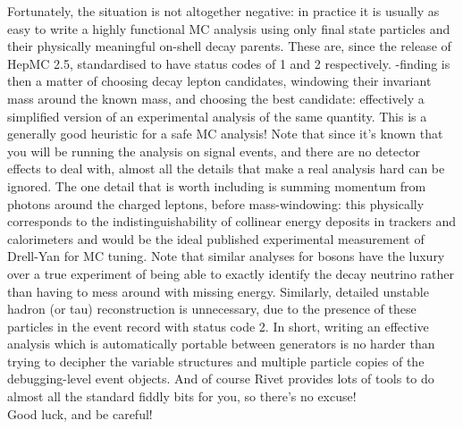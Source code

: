 Fortunately, the situation is not altogether negative: in practice it is usually
as easy to write a highly functional MC analysis using only final state
particles and their physically meaningful on-shell decay parents. These are,
since the release of HepMC 2.5, standardised to have status codes of 1 and 2
respectively. \PZ-finding is then a matter of choosing decay lepton candidates,
windowing their invariant mass around the known \PZ mass, and choosing the best
\PZ candidate: effectively a simplified version of an experimental analysis of
the same quantity. This is a generally good heuristic for a safe MC analysis!
Note that since it's known that you will be running the analysis on signal
events, and there are no detector effects to deal with, almost all the details
that make a real analysis hard can be ignored. The one detail that is worth
including is summing momentum from photons around the charged leptons, before
mass-windowing: this physically corresponds to the indistinguishability of
collinear energy deposits in trackers and calorimeters and would be the ideal
published experimental measurement of Drell-Yan \pT for MC tuning. Note that
similar analyses for \PW bosons have the luxury over a true experiment of being
able to exactly identify the decay neutrino rather than having to mess around
with missing energy. Similarly, detailed unstable hadron (or tau) reconstruction
is unnecessary, due to the presence of these particles in the event record with
status code 2. In short, writing an effective analysis which is automatically
portable between generators is no harder than trying to decipher the variable
structures and multiple particle copies of the debugging-level event
objects. And of course Rivet provides lots of tools to do almost all the
standard fiddly bits for you, so there's no excuse!\\[\lineskip]

\noindent
Good luck, and be careful!


